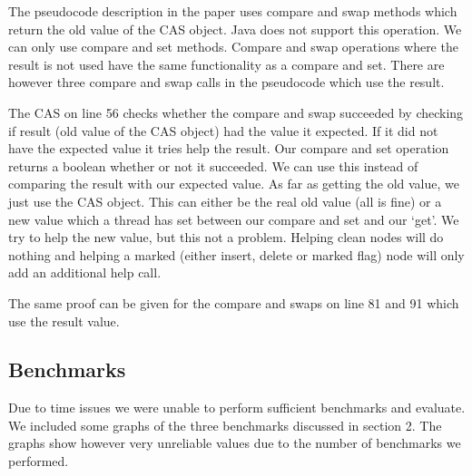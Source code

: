 \documentclass[10pt,a4paper]{article}
\begin{document}
The pseudocode description in the paper uses compare and swap methods which return the old value of the CAS object. Java does not support this operation. We can only use compare and set methods. Compare and swap operations where the result is not used have the same functionality as a compare and set. There are however three compare and swap calls in the pseudocode which use the result.

The CAS on line 56 checks whether the compare and swap succeeded by checking if result (old value of the CAS object) had the value it expected. If it did not have the expected value it tries help the result. Our compare and set operation returns a boolean whether or not it succeeded. We can use this instead of comparing the result with our expected value. As far as getting the old value, we just use the CAS object. This can either be the real old value (all is fine) or a new value which a thread has set between our compare and set and our `get'. We try to help the new value, but this not a problem. Helping clean nodes will do nothing and helping a marked (either insert, delete or marked flag) node will only add an additional help call.

The same proof can be given for the compare and swaps on line 81 and 91 which use the result value.





\subsection{Benchmarks}
Due to time issues we were unable to perform sufficient benchmarks and evaluate. We included some graphs of the three benchmarks discussed in section 2. The graphs show however very unreliable values due to the number of benchmarks we performed.
\end{document}

